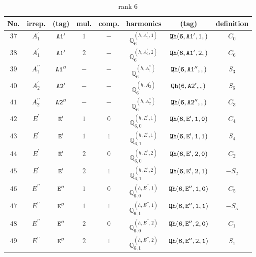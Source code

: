 \documentclass[fleqn,8pt]{jsarticle}
\begin{document}
\begin{table}[ht!]
\begin{center}
\caption{rank 6}
\renewcommand{\arraystretch}{1.3}
\begin{tabular}{cccccccc} \hline \hline
No. & irrep. & (tag) & mul. & comp. & harmonics & (tag) & definition \\ \hline
$ 37 $ & $ A_{1}^{\prime} $ & $ {\tt A1'} $ & $ 1 $ & $ - $ & $ \mathbb{Q}_{6}^{(h,A_{1}^{\prime},1)} $ & $ {\tt Qh(6,A1',1,)} $ & $ C_{0} $ \\
$ 38 $ & $ A_{1}^{\prime} $ & $ {\tt A1'} $ & $ 2 $ & $ - $ & $ \mathbb{Q}_{6}^{(h,A_{1}^{\prime},2)} $ & $ {\tt Qh(6,A1',2,)} $ & $ C_{6} $ \\
$ 39 $ & $ A_{1}^{\prime\prime} $ & $ {\tt A1''} $ & $ - $ & $ - $ & $ \mathbb{Q}_{6}^{(h,A_{1}^{\prime\prime})} $ & $ {\tt Qh(6,A1'',,)} $ & $ S_{3} $ \\
$ 40 $ & $ A_{2}^{\prime} $ & $ {\tt A2'} $ & $ - $ & $ - $ & $ \mathbb{Q}_{6}^{(h,A_{2}^{\prime})} $ & $ {\tt Qh(6,A2',,)} $ & $ S_{6} $ \\
$ 41 $ & $ A_{2}^{\prime\prime} $ & $ {\tt A2''} $ & $ - $ & $ - $ & $ \mathbb{Q}_{6}^{(h,A_{2}^{\prime\prime})} $ & $ {\tt Qh(6,A2'',,)} $ & $ C_{3} $ \\
$ 42 $ & $ E^{\prime} $ & $ {\tt E'} $ & $ 1 $ & $ 0 $ & $ \mathbb{Q}_{6,0}^{(h,E^{\prime},1)} $ & $ {\tt Qh(6,E',1,0)} $ & $ C_{4} $ \\
$ 43 $ & $ E^{\prime} $ & $ {\tt E'} $ & $ 1 $ & $ 1 $ & $ \mathbb{Q}_{6,1}^{(h,E^{\prime},1)} $ & $ {\tt Qh(6,E',1,1)} $ & $ S_{4} $ \\
$ 44 $ & $ E^{\prime} $ & $ {\tt E'} $ & $ 2 $ & $ 0 $ & $ \mathbb{Q}_{6,0}^{(h,E^{\prime},2)} $ & $ {\tt Qh(6,E',2,0)} $ & $ C_{2} $ \\
$ 45 $ & $ E^{\prime} $ & $ {\tt E'} $ & $ 2 $ & $ 1 $ & $ \mathbb{Q}_{6,1}^{(h,E^{\prime},2)} $ & $ {\tt Qh(6,E',2,1)} $ & $ - S_{2} $ \\
$ 46 $ & $ E^{\prime\prime} $ & $ {\tt E''} $ & $ 1 $ & $ 0 $ & $ \mathbb{Q}_{6,0}^{(h,E^{\prime\prime},1)} $ & $ {\tt Qh(6,E'',1,0)} $ & $ C_{5} $ \\
$ 47 $ & $ E^{\prime\prime} $ & $ {\tt E''} $ & $ 1 $ & $ 1 $ & $ \mathbb{Q}_{6,1}^{(h,E^{\prime\prime},1)} $ & $ {\tt Qh(6,E'',1,1)} $ & $ - S_{5} $ \\
$ 48 $ & $ E^{\prime\prime} $ & $ {\tt E''} $ & $ 2 $ & $ 0 $ & $ \mathbb{Q}_{6,0}^{(h,E^{\prime\prime},2)} $ & $ {\tt Qh(6,E'',2,0)} $ & $ C_{1} $ \\
$ 49 $ & $ E^{\prime\prime} $ & $ {\tt E''} $ & $ 2 $ & $ 1 $ & $ \mathbb{Q}_{6,1}^{(h,E^{\prime\prime},2)} $ & $ {\tt Qh(6,E'',2,1)} $ & $ S_{1} $ \\
 \hline \hline
\end{tabular}
\end{center}
\end{table}
\end{document}
